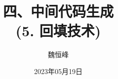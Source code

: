 \documentclass[handout]{beamer}
\title[中间代码生成]{四、中间代码生成 \\ (5. 回填技术)}
\author[魏恒峰]{\large 魏恒峰}
\institute{hfwei@nju.edu.cn}
\date{2023年05月19日}
\begin{document}
\maketitle


\thankyou{}

\end{document}
